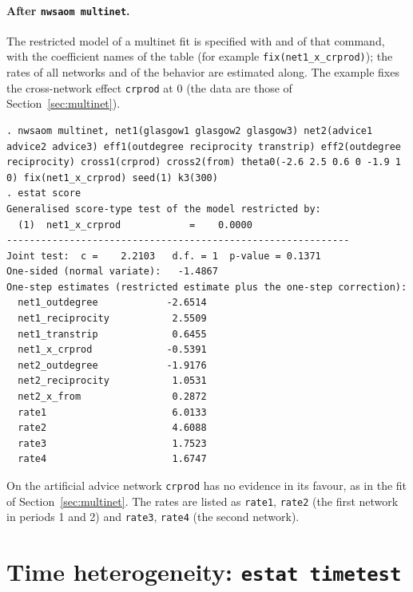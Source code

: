 \paragraph{After \texttt{nwsaom multinet}.} The restricted model of a multinet fit is specified with  and  of that command, with the coefficient names of the table (for example \texttt{fix(net1\_x\_crprod)}); the rates of all networks and of the behavior are estimated along. The example fixes the cross-network effect \texttt{crprod} at 0 (the data are those of Section~\ref{sec:multinet}).
\begin{lstlisting}
. nwsaom multinet, net1(glasgow1 glasgow2 glasgow3) net2(advice1 advice2 advice3) eff1(outdegree reciprocity transtrip) eff2(outdegree reciprocity) cross1(crprod) cross2(from) theta0(-2.6 2.5 0.6 0 -1.9 1 0) fix(net1_x_crprod) seed(1) k3(300)
. estat score
Generalised score-type test of the model restricted by:
  (1)  net1_x_crprod            =    0.0000
------------------------------------------------------------
Joint test:  c =    2.2103   d.f. = 1  p-value = 0.1371
One-sided (normal variate):   -1.4867
One-step estimates (restricted estimate plus the one-step correction):
  net1_outdegree            -2.6514
  net1_reciprocity           2.5509
  net1_transtrip             0.6455
  net1_x_crprod             -0.5391
  net2_outdegree            -1.9176
  net2_reciprocity           1.0531
  net2_x_from                0.2872
  rate1                      6.0133
  rate2                      4.6088
  rate3                      1.7523
  rate4                      1.6747
\end{lstlisting}
On the artificial advice network \texttt{crprod} has no evidence in its favour, as in the fit of Section~\ref{sec:multinet}. The rates are listed as \texttt{rate1}, \texttt{rate2} (the first network in periods 1 and 2) and \texttt{rate3}, \texttt{rate4} (the second network).

\section{Time heterogeneity: \texttt{estat timetest}}

